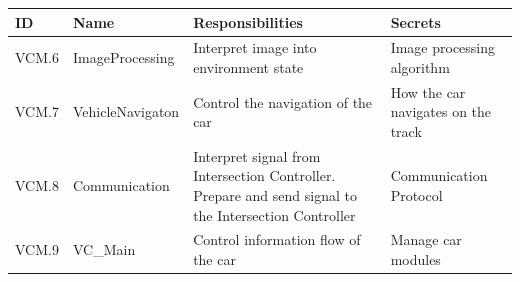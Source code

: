 \documentclass [10pt]{article}
\begin{document}
\begin{longtable}{ |p{ }  | p{ } |  p{ } |  p{ } |}  \hline
    
    \textbf{ID} & \textbf{Name} &  \textbf{Responsibilities} & \textbf{Secrets} \\ \hline
    
    \cellcolor{tableCell}VCM.6  &\cellcolor{tableCell}ImageProcessing &\cellcolor{tableCell}Interpret image into environment state &\cellcolor{tableCell}Image processing algorithm  \\ \hline
    
    VCM.7 & VehicleNavigaton & Control the navigation of the car & How the car navigates on the track \\ \hline
    
    \cellcolor{tableCell}VCM.8  & \cellcolor{tableCell}Communication & \cellcolor{tableCell}Interpret signal from Intersection Controller. Prepare and send signal to the Intersection Controller & \cellcolor{tableCell}Communication Protocol \\ \hline

    VCM.9 & VC\_Main & Control information flow of the car & Manage car modules \\ \hline
    
\end{longtable}




\end{document}
